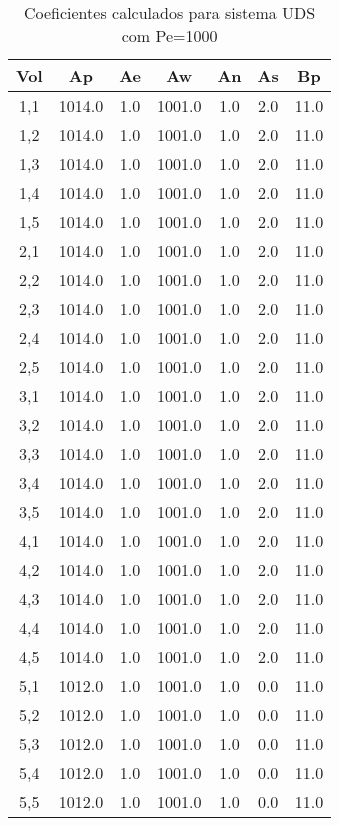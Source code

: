 \documentclass[]{article}
\begin{document}
\begin{table}[H]
	\centering
	\begin{tabular}{|c|c|c|c|c|c|c|}
		\hline
		\textbf{Vol} & \textbf{Ap} & \textbf{Ae} & \textbf{Aw} & \textbf{An} & \textbf{As} & \textbf{Bp} \\
		\hline
		1,1  & 1014.0  & 1.0  & 1001.0  & 1.0  & 2.0  & 11.0 \\
		1,2  & 1014.0  & 1.0  & 1001.0  & 1.0  & 2.0  & 11.0 \\
		1,3  & 1014.0  & 1.0  & 1001.0  & 1.0  & 2.0  & 11.0 \\
		1,4  & 1014.0  & 1.0  & 1001.0  & 1.0  & 2.0  & 11.0 \\
		1,5  & 1014.0  & 1.0  & 1001.0  & 1.0  & 2.0  & 11.0 \\
		2,1  & 1014.0  & 1.0  & 1001.0  & 1.0  & 2.0  & 11.0 \\
		2,2  & 1014.0  & 1.0  & 1001.0  & 1.0  & 2.0  & 11.0 \\
		2,3  & 1014.0  & 1.0  & 1001.0  & 1.0  & 2.0  & 11.0 \\
		2,4  & 1014.0  & 1.0  & 1001.0  & 1.0  & 2.0  & 11.0 \\
		2,5  & 1014.0  & 1.0  & 1001.0  & 1.0  & 2.0  & 11.0 \\
		3,1  & 1014.0  & 1.0  & 1001.0  & 1.0  & 2.0  & 11.0 \\
		3,2  & 1014.0  & 1.0  & 1001.0  & 1.0  & 2.0  & 11.0 \\
		3,3  & 1014.0  & 1.0  & 1001.0  & 1.0  & 2.0  & 11.0 \\
		3,4  & 1014.0  & 1.0  & 1001.0  & 1.0  & 2.0  & 11.0 \\
		3,5  & 1014.0  & 1.0  & 1001.0  & 1.0  & 2.0  & 11.0 \\
		4,1  & 1014.0  & 1.0  & 1001.0  & 1.0  & 2.0  & 11.0 \\
		4,2  & 1014.0  & 1.0  & 1001.0  & 1.0  & 2.0  & 11.0 \\
		4,3  & 1014.0  & 1.0  & 1001.0  & 1.0  & 2.0  & 11.0 \\
		4,4  & 1014.0  & 1.0  & 1001.0  & 1.0  & 2.0  & 11.0 \\
		4,5  & 1014.0  & 1.0  & 1001.0  & 1.0  & 2.0  & 11.0 \\
		5,1  & 1012.0  & 1.0  & 1001.0  & 1.0  & 0.0  & 11.0 \\
		5,2  & 1012.0  & 1.0  & 1001.0  & 1.0  & 0.0  & 11.0 \\
		5,3  & 1012.0  & 1.0  & 1001.0  & 1.0  & 0.0  & 11.0 \\
		5,4  & 1012.0  & 1.0  & 1001.0  & 1.0  & 0.0  & 11.0 \\
		5,5  & 1012.0  & 1.0  & 1001.0  & 1.0  & 0.0  & 11.0 \\
		\hline
	\end{tabular}
	\caption{Coeficientes calculados para sistema UDS com Pe=1000}
\end{table}
\end{document}
